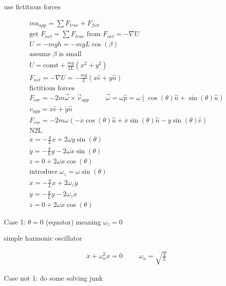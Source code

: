\documentclass[fleqn]{report}
\newcommand{\hp}{\hspace{1cm}}
\newcommand{\const}{\textrm{const}}
\newcommand{\equations} [1] {
\begin{gather*}
#1
\end{gather*}
}
\begin{document}
use fictitious forces 

\equations{
    m a_{app} = \sum F_{true} + F_{fict}
    \\
    \textrm{get } F_{net} = \sum F_{true} \textrm{ from } F_{net} = -\nabla U
    \\
    U = -mgh = -mgL \cos(\beta)
    \\
    \textrm{assume $\beta$ is small}
    \\
    U = \const + \frac{mg}{2L}(x^2 + y^2)
    \\
    F_{net} = - \nabla U = - \frac{mg}{L} (x \hat e + y \hat n)
    \\
    \textrm{fictitious forces}
    \\
    F_{cor} = -2m \vec \omega \times \vec v_{app}
    \hp 
    \vec \omega = \omega \hat p = 
    \omega (\cos(\theta) \hat n + \sin(\theta) \hat u)
    \\
    v_{app} = \dot x \hat e + \dot y \hat n
    \\
    F_{cor} = 
    -2m \omega 
    \left(
        -\dot x \cos(\theta) \hat u + 
        \dot x \sin(\theta) \hat n -
        \dot y \sin(\theta) \hat e
    \right)
    \\
    \textrm{N2L}
    \\
    \ddot x = - \frac{g}{L} x + 2 \omega \dot y \sin(\theta)
    \\
    \ddot y = - \frac{g}{L} y - 2 \omega \dot x \sin(\theta) 
    \\
    \ddot z = 0 + 2 \omega \dot x \cos(\theta) 
    \\
    \textrm{introduce } \omega_z = \omega \sin(\theta)
    \\
    \ddot x = 
    - \frac{g}{L} x + 2 \omega_z \dot y
    \\
    \ddot y = 
    - \frac{g}{L} y - 2 \omega_z \dot x
    \\
    \ddot z = 0 + 2 \omega \dot x \cos(\theta) 
}

Case 1: $\theta = 0$ (equator) meaning $\omega_z = 0$

simple harmonic oscillator 

\equations{
    \ddot x + \omega_n^2 x = 0
    \hp 
    \omega_n = \sqrt{\frac{g}{L}}
}

Case not 1: do some solving junk 
\end{document}
